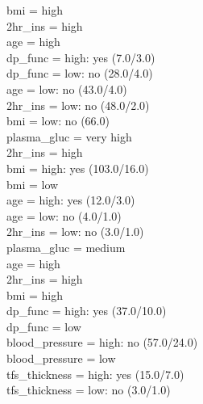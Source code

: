 \documentclass[12pt]{article}
\begin{document}
\textbar\quad   bmi = high \\
\textbar\quad   \textbar\quad   2hr\_ins = high \\
\textbar\quad   \textbar\quad   \textbar\quad   age = high \\
\textbar\quad   \textbar\quad   \textbar\quad   \textbar\quad   dp\_func = high: yes (7.0/3.0) \\
\textbar\quad   \textbar\quad   \textbar\quad   \textbar\quad   dp\_func = low: no (28.0/4.0)\\
\textbar\quad   \textbar\quad   \textbar\quad   age = low: no (43.0/4.0)\\
\textbar\quad   \textbar\quad   2hr\_ins = low: no (48.0/2.0)\\
\textbar\quad   bmi = low: no (66.0)\\
plasma\_gluc = very high\\
\textbar\quad   2hr\_ins = high\\
\textbar\quad   \textbar\quad   bmi = high: yes (103.0/16.0)\\
\textbar\quad   \textbar\quad   bmi = low\\
\textbar\quad   \textbar\quad   \textbar\quad   age = high: yes (12.0/3.0)\\
\textbar\quad   \textbar\quad   \textbar\quad   age = low: no (4.0/1.0)\\
\textbar\quad   2hr\_ins = low: no (3.0/1.0)\\
plasma\_gluc = medium\\
\textbar\quad   age = high\\
\textbar\quad   \textbar\quad   2hr\_ins = high\\
\textbar\quad   \textbar\quad   \textbar\quad   bmi = high\\
\textbar\quad   \textbar\quad   \textbar\quad   \textbar\quad   dp\_func = high: yes (37.0/10.0)\\
\textbar\quad   \textbar\quad   \textbar\quad   \textbar\quad   dp\_func = low\\
\textbar\quad   \textbar\quad   \textbar\quad   \textbar\quad   \textbar\quad   blood\_pressure = high: no (57.0/24.0)\\
\textbar\quad   \textbar\quad   \textbar\quad   \textbar\quad   \textbar\quad   blood\_pressure = low\\
\textbar\quad   \textbar\quad   \textbar\quad   \textbar\quad   \textbar\quad   \textbar\quad   tfs\_thickness = high: yes (15.0/7.0)\\
\textbar\quad   \textbar\quad   \textbar\quad   \textbar\quad   \textbar\quad   \textbar\quad   tfs\_thickness = low: no (3.0/1.0)\\
\end{document}
